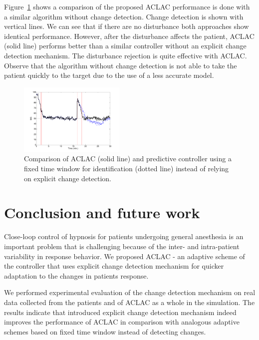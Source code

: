 Figure~\ref{fig:fig1Comparison} shows a comparison of the proposed
ACLAC performance is done with a similar algorithm without change
detection. Change detection is shown with vertical lines. We can see
that if there are no disturbance both approaches show identical
performance. However, after the disturbance affects the patient, ACLAC
(solid line) performs better than a similar controller without an
explicit change detection mechanism. The disturbance rejection is
quite effective with ACLAC. Observe that the algorithm without change
detection is not able to take the patient quickly to the target due to
the use of a less accurate model.

\begin{figure}[htb!]
\includegraphics[width=0.45\textwidth]{./articles/pics/aclac_paper/fig1Comparison.pdf}%
\caption{Comparison of ACLAC (solid line) and predictive controller
  using a fixed time window for identification (dotted line) instead
  of relying on explicit change detection.}
\label{fig:fig1Comparison}
\end{figure}

\section{Conclusion and future work}
Close-loop control of hypnosis for patients undergoing general
anesthesia is an important problem that is challenging because of the
inter- and intra-patient variability in response behavior.  We
proposed ACLAC - an adaptive scheme of the controller that uses
explicit change detection mechanism for quicker adaptation to the
changes in patients response.

We performed experimental evaluation of the change detection mechanism
on real data collected from the patients and of ACLAC as a whole in
the simulation.  The results indicate that introduced explicit change
detection mechanism indeed improves the performance of ACLAC in
comparison with analogous adaptive schemes based on fixed time window
instead of detecting changes.

